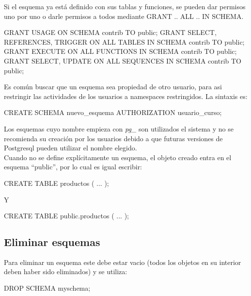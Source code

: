 Si el esquema ya está definido con sus tablas y funciones, se pueden dar permisos uno por uno o darle permisos a todos mediante GRANT .. ALL .. IN SCHEMA.\\

\begin{pyglist}
GRANT USAGE ON SCHEMA contrib TO public;
GRANT SELECT, REFERENCES, TRIGGER
 ON ALL TABLES IN SCHEMA contrib
 TO public;
GRANT EXECUTE ON ALL FUNCTIONS IN SCHEMA contrib TO public;
GRANT SELECT, UPDATE ON ALL SEQUENCES IN SCHEMA contrib TO public;
\end{pyglist}

Es común buscar que un esquema sea propiedad de otro usuario, para asi restringir las actividades de los usuarios a namespaces restringidos. La sintaxis es:\\

\begin{pyglist}
CREATE SCHEMA nuevo_esquema AUTHORIZATION usuario_curso;
\end{pyglist}

Los esquemas cuyo nombre empieza con \textit{pg\_} son utilizados el sistema y no se recomienda su creación por los usuarios debido a que futuras versiones de Postgresql pueden utilizar el nombre elegido.\\

Cuando no se define explícitamente un esquema, el objeto creado entra en el esquema “public”, por lo cual es igual escribir:\\

\begin{pyglist}
CREATE TABLE productos ( ... );
\end{pyglist}

Y\\

\begin{pyglist}
CREATE TABLE public.productos ( ... );
\end{pyglist}

\subsection{Eliminar esquemas}

Para eliminar un esquema este debe estar vacio (todos los objetos en su interior deben haber sido eliminados) y se utiliza:\\

\begin{pyglist}
DROP SCHEMA myschema;
\end{pyglist}

